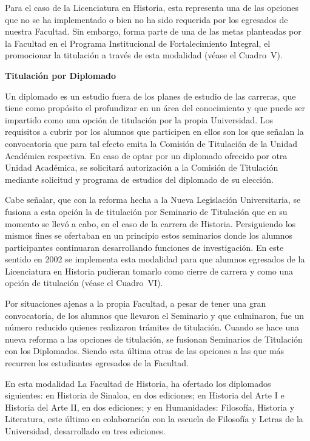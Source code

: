 Para el caso de la Licenciatura en Historia, esta representa una de las
opciones que no se ha implementado o bien no ha sido requerida por los
egresados de nuestra Facultad. Sin embargo, forma parte de una de las metas
planteadas por la Facultad en el Programa Institucional de Fortalecimiento
Integral, el promocionar la titulación a través de esta modalidad 
(véase el Cuadro~V).


\medskip
\textbf{Titulación por Diplomado}
\enlargethispage{1\baselineskip}

Un diplomado es un estudio fuera de los planes de estudio de las carreras,
que tiene como propósito el profundizar en un área del conocimiento y que
puede ser  impartido como una opción de titulación por la propia
Universidad. Los requisitos a cubrir por los alumnos que participen en
ellos son los que señalan la convocatoria que para tal efecto emita la
Comisión de Titulación de la Unidad Académica respectiva. En caso de optar
por un diplomado ofrecido por otra Unidad Académica, se solicitará
autorización a la Comisión de Titulación mediante solicitud y programa de
estudios del diplomado de su elección.


Cabe señalar, que con la reforma hecha a la Nueva Legislación
Universitaria, se fusiona a esta opción la de titulación por Seminario de
Titulación que en su momento se llevó a cabo, en el caso de la carrera de
Historia. Persiguiendo los mismos fines se ofertaban en un principio estos
seminarios donde los alumnos participantes continuaran desarrollando
funciones de investigación. En este sentido en 2002 se implementa esta
modalidad para que alumnos egresados de la Licenciatura en Historia
pudieran tomarlo como cierre de carrera y como una opción de 
titulación (véase el Cuadro~VI).


Por situaciones ajenas a la propia Facultad, a pesar de tener una gran
convocatoria, de los alumnos que llevaron el Seminario y que culminaron,
fue un número reducido quienes realizaron trámites de titulación. Cuando se
hace una nueva reforma a las opciones de titulación, se fusionan Seminarios
de Titulación con los Diplomados. Siendo esta última otras de las opciones
a las que más recurren los estudiantes egresados de la Facultad.

En esta modalidad La Facultad de Historia, ha ofertado los diplomados
siguientes: en Historia de Sinaloa, en dos ediciones; en Historia del Arte
I e Historia del Arte II, en dos ediciones; y en Humanidades: Filosofía,
Historia y Literatura, este último en colaboración con la escuela de
Filosofía y Letras de la Universidad, desarrollado en tres ediciones.

